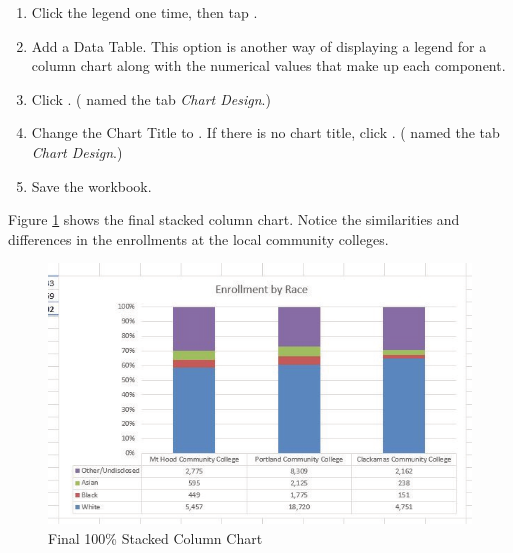 \begin{enumbox}
\begin{enumerate}
		\item Click the legend one time, then tap .
		\item Add a Data Table. This option is another way of displaying a legend for a column chart along with the numerical values that make up each component.
		\item Click . ( named the tab \textit{Chart Design}.)
		\item Change the Chart Title to . If there is no chart title, click . ( named the tab \textit{Chart Design}.)
		\item Save the  workbook.
	\end{enumerate}
\end{enumbox}
	
Figure \ref{04:fig27} shows the final stacked column chart. Notice the similarities and differences in the enrollments at the local community colleges.

\begin{figure}[H]
	\centering
	\includegraphics[width=\maxwidth{.95\linewidth}]{gfx/ch04_fig27}
	\caption{Final 100\% Stacked Column Chart}
	\label{04:fig27}
\end{figure}


